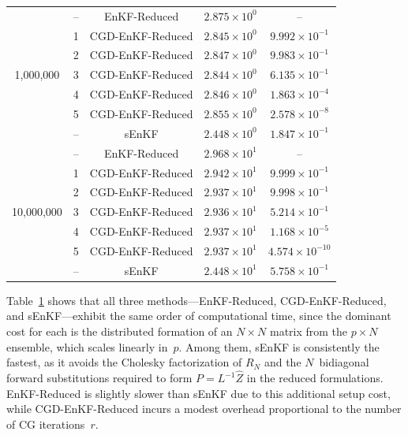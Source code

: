 \documentclass[11p]{elsarticle}
\numberwithin{equation}{section}
\begin{document}
\begin{table}[p]
\begin{tabular}{ccccc}
\midrule
\multirow{7}{*}{1,000,000}
& -- & EnKF-Reduced     & $2.875\times 10^{0}$ & -- \\
& 1  & CGD-EnKF-Reduced & $2.845\times 10^{0}$ & $9.992\times 10^{-1}$ \\
& 2  & CGD-EnKF-Reduced & $2.847\times 10^{0}$ & $9.983\times 10^{-1}$ \\
& 3  & CGD-EnKF-Reduced & $2.844\times 10^{0}$ & $6.135\times 10^{-1}$ \\
& 4  & CGD-EnKF-Reduced & $2.846\times 10^{0}$ & $1.863\times 10^{-4}$ \\
& 5  & CGD-EnKF-Reduced & $2.855\times 10^{0}$ & $2.578\times 10^{-8}$ \\
& -- & sEnKF            & $2.448\times 10^{0}$ & $1.847\times 10^{-1}$ \\

\midrule
\multirow{7}{*}{10,000,000}
& -- & EnKF-Reduced     & $2.968\times 10^{1}$ & -- \\
& 1  & CGD-EnKF-Reduced & $2.942\times 10^{1}$ & $9.999\times 10^{-1}$ \\
& 2  & CGD-EnKF-Reduced & $2.937\times 10^{1}$ & $9.998\times 10^{-1}$ \\
& 3  & CGD-EnKF-Reduced & $2.936\times 10^{1}$ & $5.214\times 10^{-1}$ \\
& 4  & CGD-EnKF-Reduced & $2.937\times 10^{1}$ & $1.168\times 10^{-5}$ \\
& 5  & CGD-EnKF-Reduced & $2.937\times 10^{1}$ & $4.574\times 10^{-10}$ \\
& -- & sEnKF            & $2.448\times 10^{1}$ & $5.758\times 10^{-1}$ \\

\bottomrule
\end{tabular}


\label{tab:enkf_cg_scaling_updated}
\end{table}



Table~\ref{tab:enkf_cg_scaling_updated} shows that all three methods---EnKF-Reduced, CGD-EnKF-Reduced, and sEnKF---exhibit the same order of computational   
  time, since the dominant cost for each is the distributed formation of an $N \times N$ matrix from the $p \times N$ ensemble, which scales linearly in~$p$.  Among them, sEnKF is consistently the fastest, as it avoids the Cholesky factorization of $R_N$ and the $N$~bidiagonal forward substitutions required to form $P = L^{-1}\widehat{Z}$ in the reduced formulations.  EnKF-Reduced is
  slightly slower than sEnKF due to this additional setup cost, while CGD-EnKF-Reduced incurs a modest overhead proportional to the
  number of CG iterations~$r$.
\end{document}
